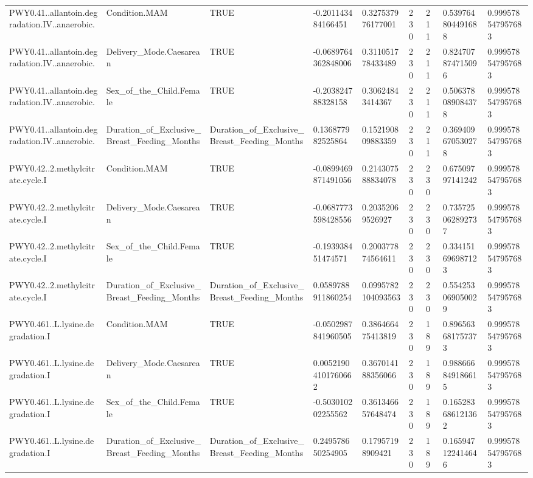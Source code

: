 \begin{longtable}{lllllllll}
PWY0.41..allantoin.degradation.IV..anaerobic. & Condition.MAM & TRUE & -0.201143484166451 & 0.327537976177001 & 230 & 211 & 0.539764804491688 & 0.999578547957683 \\
PWY0.41..allantoin.degradation.IV..anaerobic. & Delivery\_Mode.Caesarean & TRUE & -0.0689764362848006 & 0.311051778433489 & 230 & 211 & 0.824707874715096 & 0.999578547957683 \\
PWY0.41..allantoin.degradation.IV..anaerobic. & Sex\_of\_the\_Child.Female & TRUE & -0.203824788328158 & 0.30624843414367 & 230 & 211 & 0.506378089084378 & 0.999578547957683 \\
PWY0.41..allantoin.degradation.IV..anaerobic. & Duration\_of\_Exclusive\_Breast\_Feeding\_Months & Duration\_of\_Exclusive\_Breast\_Feeding\_Months & 0.136877982525864 & 0.152190809883359 & 230 & 211 & 0.369409670530278 & 0.999578547957683 \\
PWY0.42..2.methylcitrate.cycle.I & Condition.MAM & TRUE & -0.0899469871491056 & 0.214307588834078 & 230 & 230 & 0.67509797141242 & 0.999578547957683 \\
PWY0.42..2.methylcitrate.cycle.I & Delivery\_Mode.Caesarean & TRUE & -0.0687773598428556 & 0.20352069526927 & 230 & 230 & 0.735725062892737 & 0.999578547957683 \\
PWY0.42..2.methylcitrate.cycle.I & Sex\_of\_the\_Child.Female & TRUE & -0.193938451474571 & 0.200377874564611 & 230 & 230 & 0.334151696987123 & 0.999578547957683 \\
PWY0.42..2.methylcitrate.cycle.I & Duration\_of\_Exclusive\_Breast\_Feeding\_Months & Duration\_of\_Exclusive\_Breast\_Feeding\_Months & 0.0589788911860254 & 0.0995782104093563 & 230 & 230 & 0.554253069050029 & 0.999578547957683 \\
PWY0.461..L.lysine.degradation.I & Condition.MAM & TRUE & -0.0502987841960505 & 0.386466475413819 & 230 & 189 & 0.896563681757373 & 0.999578547957683 \\
PWY0.461..L.lysine.degradation.I & Delivery\_Mode.Caesarean & TRUE & 0.00521904101760662 & 0.367014188356066 & 230 & 189 & 0.988666849186615 & 0.999578547957683 \\
PWY0.461..L.lysine.degradation.I & Sex\_of\_the\_Child.Female & TRUE & -0.503010202255562 & 0.361346657648474 & 230 & 189 & 0.165283686121362 & 0.999578547957683 \\
PWY0.461..L.lysine.degradation.I & Duration\_of\_Exclusive\_Breast\_Feeding\_Months & Duration\_of\_Exclusive\_Breast\_Feeding\_Months & 0.249578650254905 & 0.17957198909421 & 230 & 189 & 0.165947122414646 & 0.999578547957683 \\

\end{longtable}

